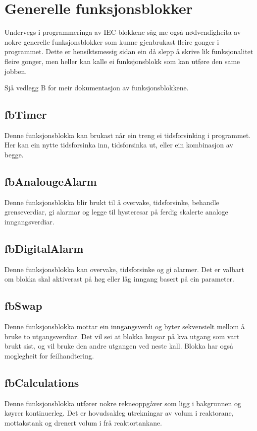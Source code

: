 \section{Generelle funksjonsblokker}
\thispagestyle{fancy}

Undervegs i programmeringa av \gls{IEC}-blokkene såg me også nødvendigheita av nokre generelle funksjonsblokker
som kunne gjenbrukast fleire gonger i programmet. Dette er hensiktsmessig sidan ein då slepp å skrive lik 
funksjonalitet fleire gonger, men heller kan kalle ei funksjonsblokk som kan utføre den same jobben.

Sjå vedlegg B for meir dokumentasjon av funksjonsblokkene.

\subsection{fbTimer}
Denne funksjonsblokka kan brukast når ein treng ei tidsforsinking i programmet.
Her kan ein nytte tidsforsinka inn, tidsforsinka ut, eller ein kombinasjon av begge.

\subsection{fbAnalougeAlarm}
Denne funksjonsblokka blir brukt til å overvake, tidsforsinke, behandle grenseverdiar, 
gi alarmar og legge til hysteresar på ferdig skalerte analoge inngangsverdiar.

\subsection{fbDigitalAlarm}
Denne funksjonsblokka kan overvake, tidsforsinke og gi alarmer. Det er valbart om blokka skal aktiverast på høg eller låg
inngang basert på ein parameter.

\subsection{fbSwap}
Denne funksjonsblokka mottar ein inngangsverdi og byter sekvensielt mellom å bruke to utgangsverdiar. Det vil sei at blokka hugsar på kva utgang som vart brukt sist,
og vil bruke den andre utgangen ved neste kall. Blokka har også moglegheit for feilhandtering.

\subsection{fbCalculations}
Denne funksjonsblokka utfører nokre rekneoppgåver som ligg i bakgrunnen og køyrer kontinuerleg. 
Det er hovudsakleg utrekningar av volum i reaktorane, mottakstank og drenert volum i frå reaktortankane.

